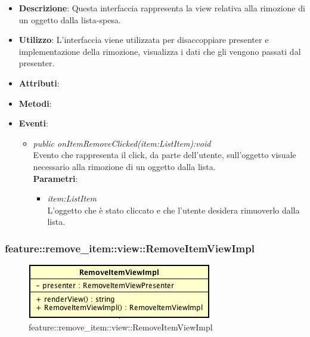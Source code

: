 \begin{itemize}
\item \textbf{Descrizione}: Questa interfaccia rappresenta la view relativa alla rimozione di un oggetto dalla lista-spesa.
\item \textbf{Utilizzo}: L'interfaccia viene utilizzata per disaccoppiare presenter e implementazione della rimozione, visualizza i dati che gli vengono passati dal presenter.
\item \textbf{Attributi}: 
\item \textbf{Metodi}:
\item \textbf{Eventi}:
	\begin{itemize}	
	\item \textit{public onItemRemoveClicked(item:ListItem):void}\\
	Evento che rappresenta il click, da parte dell'utente, sull'oggetto visuale necessario alla rimozione di un oggetto dalla lista.
			\\ \textbf{Parametri}: \begin{itemize}
			\item \textit{item:ListItem}\\
			L'oggetto che è stato cliccato e che l'utente desidera rimuoverlo dalla lista.
			\end{itemize} 
	\end{itemize}
\end{itemize}

\subsubsection{feature::remove\_item::view::RemoveItemViewImpl}

\label{feature::remove_item::view::RemoveItemViewImpl}
\begin{figure}[H]
	\centering
	\includegraphics[scale=0.5]{Sezioni/SottosezioniST/img/app/RemoveItemViewImpl.png}
	\caption{feature::remove\_item::view::RemoveItemViewImpl}
\end{figure}

